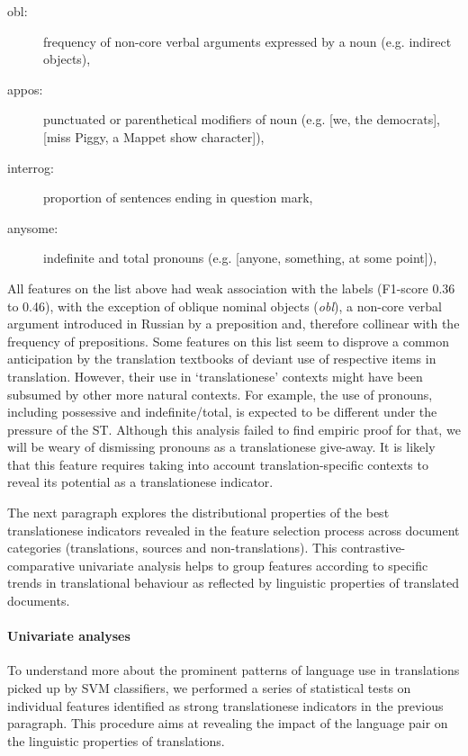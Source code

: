 \begin{description}
	\item[obl:] frequency of non-core verbal arguments expressed by a noun (e.g. indirect objects),
	\item[appos:] punctuated or parenthetical modifiers of noun (e.g.  [we, the democrats],  [miss Piggy, a Mappet show character]),
	\item[interrog:] proportion of sentences ending in question mark,
	\item[anysome:] indefinite and total pronouns (e.g.  [anyone, something, at some point]),

\end{description}

All features on the list above had weak association with the labels (F1-score 0.36 to 0.46), with the exception of oblique nominal objects (\textit{obl}), a non-core verbal argument introduced in Russian by a preposition and, therefore collinear with the frequency of prepositions. Some features on this list seem to disprove a common anticipation by the translation textbooks of deviant use of respective items in translation. However, their use in `translationese' contexts might have been subsumed by other more natural contexts. For example, the use of pronouns, including possessive and indefinite/total, is expected to be different under the pressure of the ST. Although this analysis failed to find empiric proof for that, we will be weary of dismissing pronouns as a translationese give-away. It is likely that this feature requires taking into account translation-specific contexts to reveal its potential as a translationese indicator.      

The next paragraph explores the distributional properties of the best translationese indicators revealed in the feature selection process across document categories (translations, sources and non-translations). This contrastive-comparative univariate analysis helps to group features according to specific trends in translational behaviour as reflected by linguistic properties of translated documents. 

\paragraph{\label{par:featsunivar}Univariate analyses}
To understand more about the prominent patterns of language use in translations picked up by SVM classifiers, we performed a series of statistical tests on individual features identified as strong translationese indicators in the previous paragraph. This procedure aims at revealing the impact of the language pair on the linguistic properties of translations. 
 
